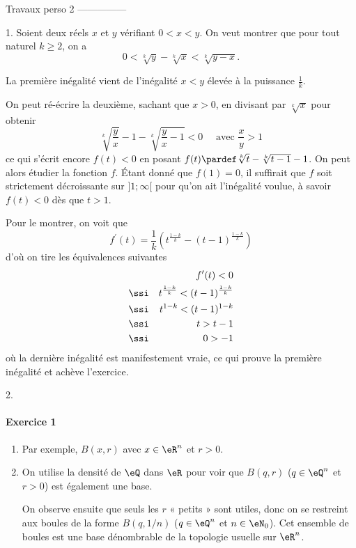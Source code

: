    Travaux perso 2 ---------------

   1. Soient deux réels $x$ et $y$ vérifiant $0 < x < y$. On veut montrer
   que pour tout naturel $k \geq 2$, on a
   \[0 < \sqrt[k]{y} - \sqrt[k]{x} < \sqrt[k]{y-x}.\]

   La première inégalité vient de l'inégalité $x < y$ élevée à la
   puissance $\frac1k$.

   On peut ré-écrire la deuxième, sachant que $x > 0$, en divisant par
   $\sqrt[k]{x}$ pour obtenir
   \begin{equation}
    \sqrt[k]{\frac yx} - 1 - \sqrt[k]{\frac yx-1} < 0 \quad \text{ avec }\frac xy > 1
   \end{equation}
     ce qui s'écrit encore $f(t) < 0$ en posant
   $f(t) \pardef \sqrt[k]t - \sqrt[k]{t-1} - 1$. On peut alors étudier
   la fonction $f$. Étant donné que $f(1) = 0$, il suffirait que $f$
   soit strictement décroissante sur $]1;\infty[$ pour qu'on ait
   l'inégalité voulue, à savoir $f(t) < 0$ dès que $t > 1$.

   Pour le montrer, on voit que
   \[f^\prime(t) = \frac 1k \left(t^{\frac{1-k}k} -
     ({t-1})^{\frac{1-k}k}\right)\] d'où on tire les équivalences
   suivantes
   \begin{align}
     & & f^\prime(t) < 0\\
     &\ssi& t^{\frac{1-k}k} < ({t-1})^{\frac{1-k}k}\\
     &\ssi& t^{1-k} < ({t-1})^{1-k}\\
     &\ssi& t > t-1\\
     &\ssi& 0 > -1
   \end{align}
   où la dernière inégalité est manifestement vraie, ce qui prouve la
   première inégalité et achève l'exercice.

   2.


 \paragraph{Exercice 1}
 \begin{enumerate}
 \item Par exemple, $B(x,r)$ avec $x \in \eR^n$ et $r > 0$.

 \item On utilise la densité de $\eQ$ dans $\eR$ pour voir que $B(q,r)$
   ($q \in \eQ^n$ et $r > 0$) est également une base.

   On observe ensuite que seuls les $r$ « petits » sont utiles,
   donc on se restreint aux boules de la forme $B(q,1/n)$ ($q \in
   \eQ^n$ et $n \in \eN_0$). Cet ensemble de boules est une base
   dénombrable de la topologie usuelle sur
   $\eR^n$.
 \end{enumerate}

